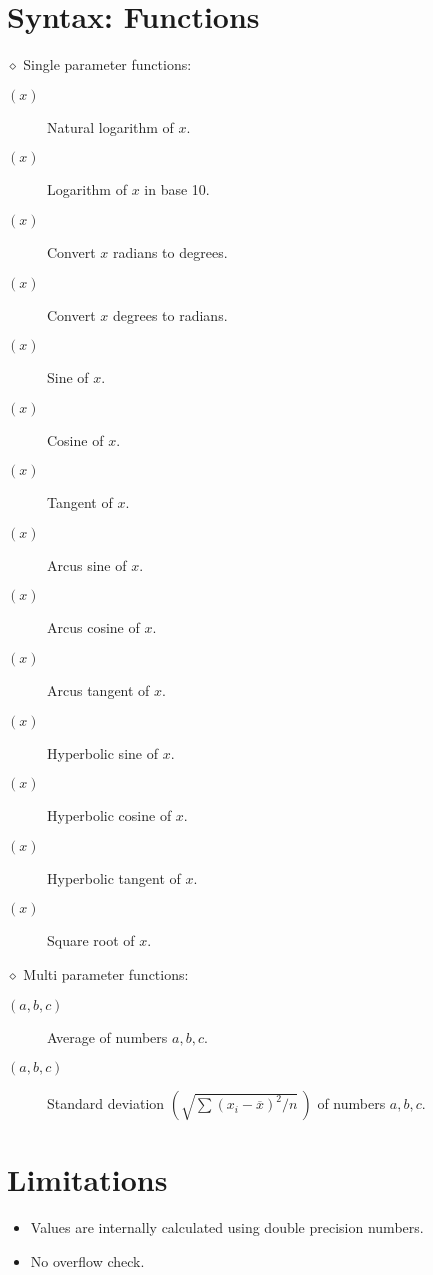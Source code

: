 \section{Syntax: Functions}

	$\diamond$ Single parameter functions:
	\begin{description}
	\item[$(x)$]	Natural logarithm of $x$.
	\item[$(x)$]	Logarithm of $x$ in base 10.
	\item[$(x)$]	Convert $x$ radians to degrees.
	\item[$(x)$]	Convert $x$ degrees to radians.
	\item[$(x)$]	Sine of $x$.
	\item[$(x)$]	Cosine of $x$.
	\item[$(x)$]	Tangent of $x$.
	\item[$(x)$]	Arcus sine of $x$.
	\item[$(x)$]	Arcus cosine of $x$.
	\item[$(x)$]	Arcus tangent of $x$.
	\item[$(x)$]	Hyperbolic sine of $x$.
	\item[$(x)$]	Hyperbolic cosine of $x$.
	\item[$(x)$]	Hyperbolic tangent of $x$.
	\item[$(x)$]	Square root of $x$.
	\end{description}

	$\diamond$ Multi parameter functions:
	\begin{description}
	\item[$(a, b, c)$]	Average of numbers $a, b, c$.
	\item[$(a, b, c)$]	Standard deviation
				$\left( \sqrt{\sum(x_i - \overline x)^2 / n}\, \right)$
				of numbers $a, b, c$.
	\end{description}


\section{Limitations}


	\begin{itemize}
	\item Values are internally calculated using double precision numbers.
	\item No overflow check.
	\end{itemize}


